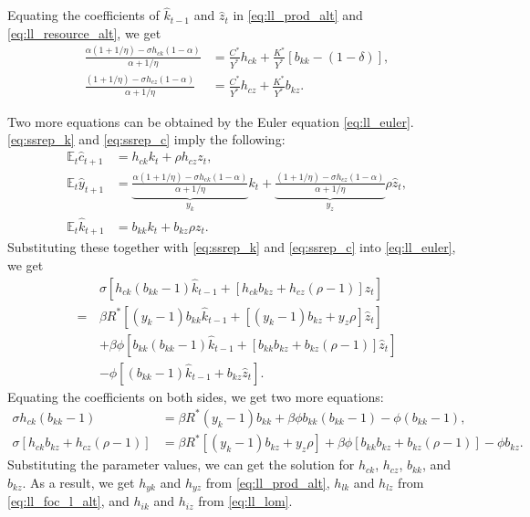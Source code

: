 \documentclass[12pt]{article}
\begin{document}
\begin{enumerate}[label=\arabic*.]
Equating the coefficients of $\hat{k}_{t-1}$ and $\hat{z}_t$ in \eqref{eq:ll_prod_alt} and \eqref{eq:ll_resource_alt}, we get
\begin{align}
    \frac{\alpha (1 + 1/\eta) - \sigma h_{ck} (1-\alpha)}{\alpha + 1/\eta} &= \frac{C^*}{Y^*}h_{ck} + \frac{K^*}{Y^*}[b_{kk} - (1-\delta)], \label{eq:coeff_k_1}\\
    \frac{(1 + 1/\eta) - \sigma h_{cz} (1-\alpha)}{\alpha + 1/\eta} &= \frac{C^*}{Y^*}h_{cz} + \frac{K^*}{Y^*}b_{kz}. \label{eq:coeff_z_1}
\end{align}

Two more equations can be obtained by the Euler equation \eqref{eq:ll_euler}. \eqref{eq:ssrep_k} and \eqref{eq:ssrep_c} imply the following:
\begin{align*}
    \mathbb{E}_t \hat{c}_{t+1} &= h_{ck} k_t + \rho h_{cz} z_t,\\
    \mathbb{E}_t \hat{y}_{t+1} &= \underbrace{\frac{\alpha (1 + 1/\eta) - \sigma h_{ck} (1-\alpha)}{\alpha + 1/\eta}}_{y_k} k_t + \underbrace{\frac{(1 + 1/\eta) - \sigma h_{cz} (1-\alpha)}{\alpha + 1/\eta}}_{y_z} \rho \hat{z}_t, \\
    \mathbb{E}_t \hat{k}_{t+1} &= b_{kk} k_t + b_{kz} \rho z_t.
\end{align*}
Substituting these together with \eqref{eq:ssrep_k} and \eqref{eq:ssrep_c} into \eqref{eq:ll_euler}, we get
\begin{align*}
    &\sigma \left[h_{ck}(b_{kk}-1)\hat{k}_{t-1} + [h_{ck}b_{kz} + h_{cz}(\rho-1)]\hat{z}_t\right]\\
    = \, &\beta R^* \left[(y_k - 1)b_{kk} \hat{k}_{t-1} + [(y_k - 1)b_{kz} + y_z\rho]\hat{z}_t\right]\\
    &+ \beta \phi \left[b_{kk}(b_{kk}-1)\hat{k}_{t-1} + [b_{kk}b_{kz} + b_{kz}(\rho-1)]\hat{z}_t\right]\\
    &- \phi \left[(b_{kk}-1)\hat{k}_{t-1} + b_{kz} \hat{z}_t\right].
\end{align*}
Equating the coefficients on both sides, we get two more equations:
\begin{align}
    \sigma h_{ck} (b_{kk}-1) &= \beta R^*(y_k-1)b_{kk} + \beta \phi b_{kk}(b_{kk}-1) - \phi(b_{kk}-1), \label{eq:coeff_k_2}\\
    \sigma [h_{ck}b_{kz} + h_{cz}(\rho-1)] &= \beta R^* [(y_k-1)b_{kz} + y_z\rho] + \beta \phi [b_{kk}b_{kz} + b_{kz}(\rho-1)] - \phi b_{kz}. \label{eq:coeff_z_2}
\end{align}
Substituting the parameter values, we can get the solution for $h_{ck}$, $h_{cz}$, $b_{kk}$, and $b_{kz}$. As a result, we get $h_{yk}$ and $h_{yz}$ from \eqref{eq:ll_prod_alt}, $h_{l k}$ and $h_{l z}$ from \eqref{eq:ll_foc_l_alt}, and $h_{i k}$ and $h_{i z}$ from \eqref{eq:ll_lom}.


\end{enumerate}
\end{document}
